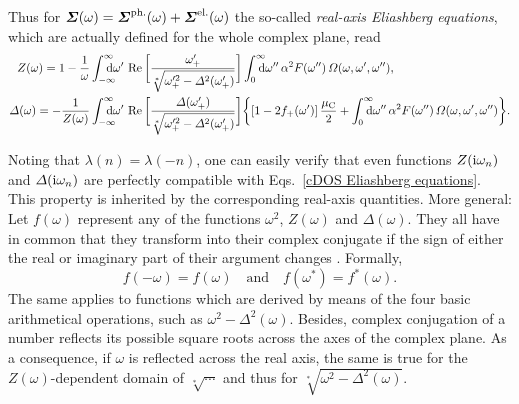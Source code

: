 Thus for $\boldsymbol {\varSigma}(\omega) = \boldsymbol {\varSigma} \sp{\text{ph.}}(\omega) + \boldsymbol {\varSigma}
\sp{\text{el.}}(\omega)$ the so-called \emph{real-axis Eliashberg equations}, which
are actually defined for the whole complex plane, read
%
\begin{align*}
    Z(\omega) = 1 - \frac 1 \omega
    &\int \from{-\infty} \till \infty \D \omega' \,
    \Re \bigg[
        \frac{\omega'_+}{\sqrt[*]{\omega'^2_+ - \Delta^2(\omega'_+)}}
    \bigg] \int \from 0 \till \infty \D \omega'' \, \alpha^2 F(\omega'') \,
    \Omega(\omega, \omega', \omega''),
    \\
    \Delta(\omega) = -\frac 1 {Z(\omega)}
    &\int \from{-\infty} \till \infty \D \omega' \,
    \Re \bigg[
        \frac{\Delta(\omega'_+)}{\sqrt[*]{\omega'^2_+ - \Delta^2(\omega'_+)}}
    \bigg]
    \bigg \{
        [1 - 2 f_+(\omega')] \, \frac {\mu \sub C} 2
        + \int \from 0 \till \infty \D \omega'' \, \alpha^2 F(\omega'') \,
        \Omega(\omega, \omega', \omega'')
    \bigg \}.
\end{align*}

Noting that $\lambda(n) = \lambda(-n)$, one can easily verify that even
functions $Z(\mathrm i \omega_n)$ and $\varDelta(\mathrm i \omega_n)$ are perfectly compatible
with Eqs.~\ref{cDOS Eliashberg equations}. This property is inherited by the
corresponding real-axis quantities. More general: Let $f(\omega)$ represent any
of the functions $\omega^2$, $Z(\omega)$ and $\Delta(\omega)$. They all have in
common that they transform into their complex conjugate if the sign of either
the real or imaginary part of their argument changes
\cite[Eq.~A5]{AmbegaokarTewordt64}. Formally,
%
\begin{equation} \label{frequency symmetries}
    f(-\omega) = f(\omega) \quad \text{and} \quad f(\omega^*) = f^*(\omega).
\end{equation}
%
The same applies to functions which are derived by means of the four basic
arithmetical operations, such as $\omega^2 - \Delta^2(\omega)$. Besides, complex
conjugation of a number reflects its possible square roots across the axes of
the complex plane. As a consequence, if $\omega$ is reflected across the real
axis, the same is true for the $Z(\omega)$-dependent domain of $\sqrt[*] \cdots$
and thus for $\sqrt[*]{\omega^2 - \Delta^2(\omega)}$.

